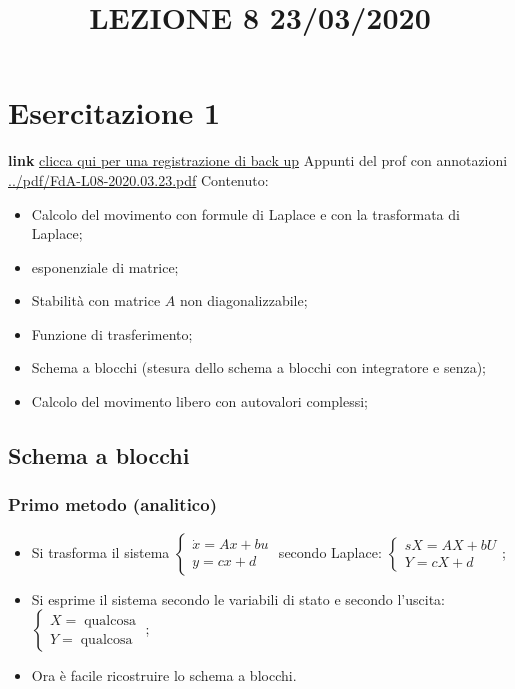 \section{Esercitazione 1}
\title{LEZIONE 8 23/03/2020}\newline
\textbf{link} \href{https://onedrive.live.com/?authkey=%21AATVJK3srNwxGzs&id=EE092FF4FF7B5B0E%212158&cid=EE092FF4FF7B5B0E}{clicca qui per una registrazione di back up}\newline
\newline
Appunti del prof con annotazioni \url{../pdf/FdA-L08-2020.03.23.pdf}\newline
Contenuto:
\begin{itemize}
    \item Calcolo del movimento con formule di Laplace e con la trasformata di Laplace;
    \item esponenziale di matrice;
    \item Stabilità con matrice $A$ non diagonalizzabile;
    \item Funzione di trasferimento;
    \item Schema a blocchi (stesura dello schema a blocchi con integratore e senza);
    \item Calcolo del movimento libero con autovalori complessi;
\end{itemize}
\subsection{Schema a blocchi}
\subsubsection{Primo metodo (analitico)}
\begin{itemize}
    \item Si trasforma il sistema $\begin{cases}
        \dot{x} = A x + bu\\ y = cx +d
    \end{cases}$ secondo Laplace: $\begin{cases}
        s X = A X + b U\\ Y = c X + d
    \end{cases}$;
    \item Si esprime il sistema secondo le variabili di stato e secondo l'uscita:$\begin{cases}
        X = \;\text{qualcosa}\;\\ Y = \;\text{qualcosa}\;
    \end{cases}$;
    \item Ora è facile ricostruire lo schema a blocchi.
\end{itemize}
